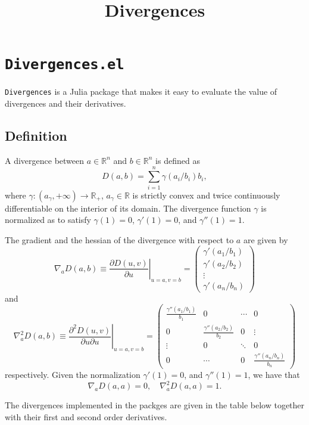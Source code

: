 \documentclass[
  letterpaper,
  DIV=11,
  numbers=noendperiod]{scrartcl}
\title{Divergences}
\author{}
\date{}
\begin{document}
\maketitle


\section{\texorpdfstring{\texttt{Divergences.el}}{Divergences.el}}\label{divergences.el}

\texttt{Divergences} is a Julia package that makes it easy to evaluate
the value of divergences and their derivatives.

\subsection{Definition}\label{definition}

A divergence between \(a\in \mathbb{R}^n\) and \(b\in\mathbb{R}^n\) is
defined as \[
D(a,b) = \sum_{i=1}^n \gamma(a_i/b_i) b_i,
\] where \(\gamma:(a_{\gamma},+\infty)\to\mathbb{R}_{+}\),
\(a_{\gamma}\in\mathbb{R}\) is strictly convex and twice continuously
differentiable on the interior of its domain. The divergence function
\(\gamma\) is normalized as to satisfy \(\gamma(1) = 0\),
\(\gamma'(1)=0\), and \(\gamma''(1)=1\).

The gradient and the hessian of the divergence with respect to \(a\) are
given by \[
\nabla_{a}D(a,b)\equiv\left.\frac{\partial D(u,v)}{\partial u}\right|_{u=a,v=b}=\begin{pmatrix}\gamma'(a_{1}/b_{1})\\
\gamma'(a_{2}/b_{2})\\
\vdots\\
\gamma'(a_{n}/b_{n})
\end{pmatrix}\] and \[
\nabla_{a}^{2}D(a,b)\equiv\left.\frac{\partial^{2}D(u,v)}{\partial u\partial u}\right|_{u=a,v=b}=\begin{pmatrix}\frac{\gamma''(a_{1}/b_{1})}{b_{1}} & 0 & \cdots & 0\\
0 & \frac{\gamma''(a_{2}/b_{2})}{b_{2}} & 0 & \vdots\\
\vdots & 0 & \ddots & 0\\
0 & \cdots & 0 & \frac{\gamma''(a_{n}/b_{n})}{b_{n}}
\end{pmatrix}
\] respectively. Given the normalization \(\gamma'(1)=0\), and
\(\gamma''(1)=1\), we have that \[
\nabla_{a}D(a,a) = 0, \quad \nabla^2_{a}D(a,a) = 1.
\]

The divergences implemented in the packges are given in the table below
together with their first and second order derivatives.
\end{document}
